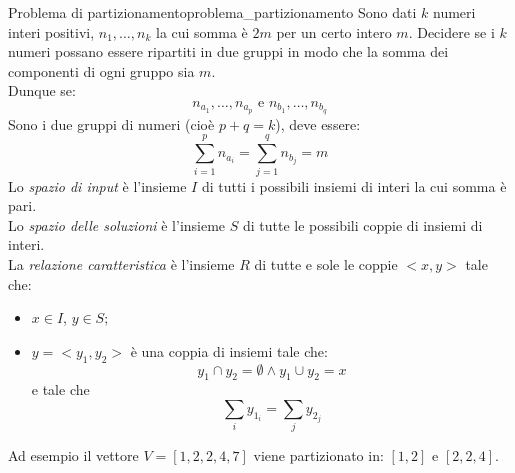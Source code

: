\documentclass[12pt]{report}
\newcommand{\nmu}{}
\begin{document}
   	\begin{example}{\nmu Problema di partizionamento}{problema_partizionamento}
   		Sono dati $k$ numeri interi positivi, $n_1, \dots, n_k$ la cui somma è $2m$ per un certo intero $m$. Decidere se i $k$ numeri possano essere ripartiti in due gruppi in modo che la somma dei componenti di ogni gruppo sia $m$. \\
   		Dunque se:
   		\[
   		n_{a_1}, \dots, n_{a_p} \text{ e } n_{b_1}, \dots, n_{b_q}
   		\]
   		Sono i due gruppi di numeri (cioè $p + q = k$), deve essere:
   		\[
   		\sum_{i=1}^{p}n_{a_i} = \sum_{j=1}^{q}n_{b_j} = m
   		\]
   		Lo \textit{spazio di input} è l'insieme $I$ di tutti i possibili insiemi di interi la cui somma è pari. \\
   		Lo \textit{spazio delle soluzioni} è l'insieme $S$ di tutte le possibili coppie di insiemi di interi. \\
   		La \textit{relazione caratteristica} è l'insieme $R$ di tutte e sole le coppie $<x, y>$ tale che:
   		\begin{itemize}
   			\item $x \in I$, $y \in S$;
   			\item $y = <y_1, y_2>$ è una coppia di insiemi tale che:
   			\[
   			y_1 \cap y_2 = \emptyset \wedge y_1 \cup y_2 = x
   			\]
   			e tale che
   			\[
   			\sum_{i}y_{1_i} = \sum_{j}y_{2_j}
   			\]
   		\end{itemize}
   		Ad esempio il vettore $V = [1, 2, 2, 4, 7]$ viene partizionato in: $[1, 2]$ e $[2, 2, 4]$.
   	\end{example}
\end{document}
